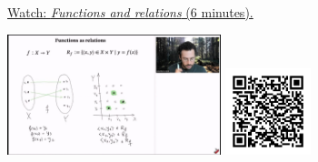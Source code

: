 
\begin{minipage}{10cm}
    \href{https://act4e-spring21.netlify.app/videos/spring2021-relations:relations:fun-rel.html}{Watch: \emph{Functions and relations} (6 minutes).}
        
    \href{https://act4e-spring21.netlify.app/videos/spring2021-relations:relations:fun-rel.html}{\includegraphics[height=3.5cm]{spring2021-relations:relations:fun-rel/thumbnails.jpg}}
    \href{https://act4e-spring21.netlify.app/videos/spring2021-relations:relations:fun-rel.html}{\includegraphics[height=2.5cm]{spring2021-relations:relations:fun-rel/qrcode.png}}
\end{minipage}
